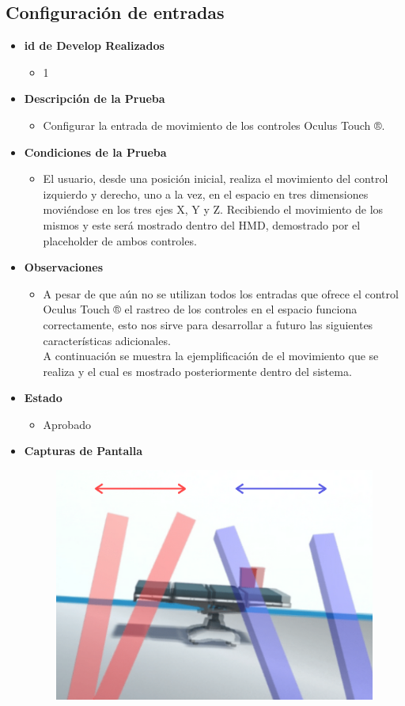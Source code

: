\subsection{Configuración de entradas}
\begin{itemize}
    \item \textbf{id de Develop Realizados}
    \begin{itemize}
        \item 1
    \end{itemize}
    \item \textbf{Descripción de la Prueba}
    \begin{itemize}
        \item Configurar la entrada de movimiento de los controles Oculus Touch ®. 
    \end{itemize}
    \item \textbf{Condiciones de la Prueba}
    \begin{itemize}
        \item El usuario, desde una posición inicial, realiza el movimiento del control izquierdo y derecho, uno a la vez, en el espacio en tres dimensiones moviéndose en los tres ejes X, Y y Z. Recibiendo el movimiento de los mismos y este será mostrado dentro del HMD, demostrado por el placeholder de ambos controles.\\
    \end{itemize}
    \item \textbf{Observaciones}
    \begin{itemize}
        \item A pesar de que aún no se utilizan todos los entradas que ofrece el control Oculus Touch ® el rastreo de los controles en el espacio funciona correctamente, esto nos sirve para desarrollar a futuro las siguientes características adicionales.\\
        A continuación se muestra la ejemplificación de el movimiento que se realiza y el cual es mostrado posteriormente dentro del sistema.        
    \end{itemize}
    \item \textbf{Estado}
    \begin{itemize}
        \item Aprobado
    \end{itemize}
    \item \textbf{Capturas de Pantalla}
    \begin{figure}[H]
       	\begin{center}
       		\includegraphics[width = .7\textwidth]{source/images/image60.png}

\end{center}
\end{figure}
\end{itemize}
